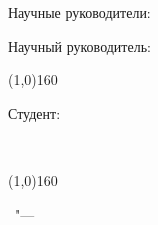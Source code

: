 %
\vspace{0pt plus4fill} %
\begin{flushright}
\ifdefined\supervisorTwoFio
Научные руководители:

\supervisorRegalia

\ifdefined\supervisorDead
\framebox{\supervisorFio}
\else
\supervisorFio
\fi

\supervisorTwoRegalia

\ifdefined\supervisorTwoDead
\framebox{\supervisorTwoFio}
\else
\supervisorFio
\fi
\else
Научный руководитель:

\supervisorRegalia


\ifdefined\supervisorDead
\framebox{\supervisorFio}
\else
\supervisorFio

\line(1,0){160}
\fi
\fi

Студент:

\thesisAuthorLastName\ \thesisAuthorOtherNames

\line(1,0){160}

\end{flushright}

%
\vspace{0pt plus4fill} %
{\centering\thesisCity\ "--- \thesisYear\par}
